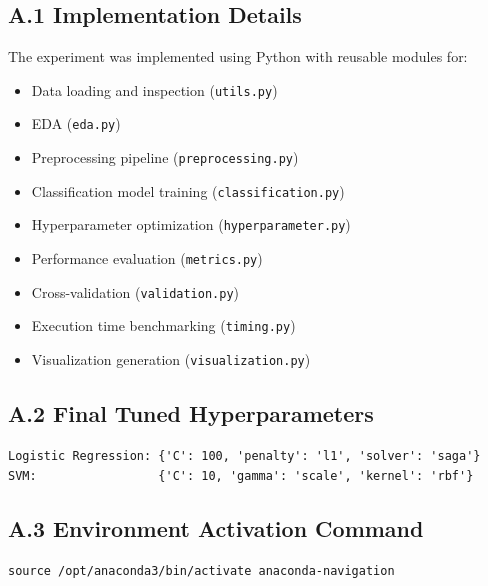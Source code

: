 \documentclass[12pt,a4paper]{article}
\begin{document}
\subsection*{A.1 Implementation Details}

The experiment was implemented using Python with reusable modules for:
\begin{itemize}
\item Data loading and inspection (\texttt{utils.py})
\item EDA (\texttt{eda.py})
\item Preprocessing pipeline (\texttt{preprocessing.py})
\item Classification model training (\texttt{classification.py})
\item Hyperparameter optimization (\texttt{hyperparameter.py})
\item Performance evaluation (\texttt{metrics.py})
\item Cross-validation (\texttt{validation.py})
\item Execution time benchmarking (\texttt{timing.py})
\item Visualization generation (\texttt{visualization.py})
\end{itemize}

\subsection*{A.2 Final Tuned Hyperparameters}

\begin{lstlisting}
Logistic Regression: {'C': 100, 'penalty': 'l1', 'solver': 'saga'}
SVM:                 {'C': 10, 'gamma': 'scale', 'kernel': 'rbf'}
\end{lstlisting}

\subsection*{A.3 Environment Activation Command}

\begin{lstlisting}
source /opt/anaconda3/bin/activate anaconda-navigation
\end{lstlisting}
\end{document}
